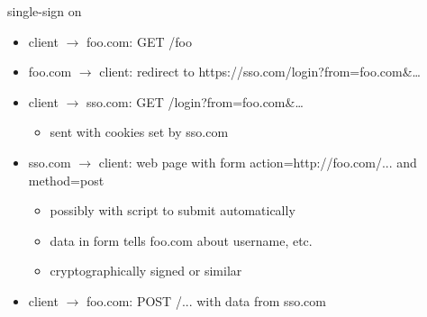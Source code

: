 \begin{frame}{single-sign on}
\begin{itemize}
\item client $\rightarrow$ foo.com: GET /foo
\item foo.com $\rightarrow$ client: redirect to https://sso.com/login?from=foo.com&\ldots
\item client $\rightarrow$ sso.com: GET /login?from=foo.com&\ldots
    \begin{itemize}
    \item sent with cookies set by sso.com
    \end{itemize}
\item sso.com $\rightarrow$ client: web page with form action=http://foo.com/... and method=post
    \begin{itemize}
    \item possibly with script to submit automatically
    \item data in form tells foo.com about username, etc.
    \item cryptographically signed or similar
    \end{itemize}
\item client $\rightarrow$ foo.com: POST /... with data from sso.com
\end{itemize}
\end{frame}
